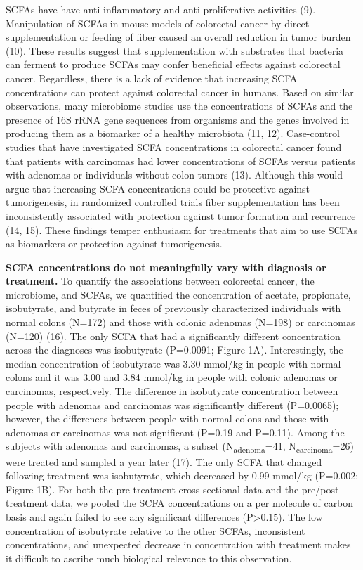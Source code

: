 \documentclass[11pt,]{article}
\begin{document}
SCFAs have have anti-inflammatory and anti-proliferative activities (9).
Manipulation of SCFAs in mouse models of colorectal cancer by direct
supplementation or feeding of fiber caused an overall reduction in tumor
burden (10). These results suggest that supplementation with substrates
that bacteria can ferment to produce SCFAs may confer beneficial effects
against colorectal cancer. Regardless, there is a lack of evidence that
increasing SCFA concentrations can protect against colorectal cancer in
humans. Based on similar observations, many microbiome studies use the
concentrations of SCFAs and the presence of 16S rRNA gene sequences from
organisms and the genes involved in producing them as a biomarker of a
healthy microbiota (11, 12). Case-control studies that have investigated
SCFA concentrations in colorectal cancer found that patients with
carcinomas had lower concentrations of SCFAs versus patients with
adenomas or individuals without colon tumors (13). Although this would
argue that increasing SCFA concentrations could be protective against
tumorigenesis, in randomized controlled trials fiber supplementation has
been inconsistently associated with protection against tumor formation
and recurrence (14, 15). These findings temper enthusiasm for treatments
that aim to use SCFAs as biomarkers or protection against tumorigenesis.

\textbf{SCFA concentrations do not meaningfully vary with diagnosis or
treatment.} To quantify the associations between colorectal cancer, the
microbiome, and SCFAs, we quantified the concentration of acetate,
propionate, isobutyrate, and butyrate in feces of previously
characterized individuals with normal colons (N=172) and those with
colonic adenomas (N=198) or carcinomas (N=120) (16). The only SCFA that
had a significantly different concentration across the diagnoses was
isobutyrate (P=0.0091; Figure 1A). Interestingly, the median
concentration of isobutyrate was 3.30 mmol/kg in people with normal
colons and it was 3.00 and 3.84 mmol/kg in people with colonic adenomas
or carcinomas, respectively. The difference in isobutyrate concentration
between people with adenomas and carcinomas was significantly different
(P=0.0065); however, the differences between people with normal colons
and those with adenomas or carcinomas was not significant (P=0.19 and
P=0.11). Among the subjects with adenomas and carcinomas, a subset
(N\textsubscript{adenoma}=41, N\textsubscript{carcinoma}=26) were
treated and sampled a year later (17). The only SCFA that changed
following treatment was isobutyrate, which decreased by 0.99 mmol/kg
(P=0.002; Figure 1B). For both the pre-treatment cross-sectional data
and the pre/post treatment data, we pooled the SCFA concentrations on a
per molecule of carbon basis and again failed to see any significant
differences (P\textgreater{}0.15). The low concentration of isobutyrate
relative to the other SCFAs, inconsistent concentrations, and unexpected
decrease in concentration with treatment makes it difficult to ascribe
much biological relevance to this observation.
\end{document}

